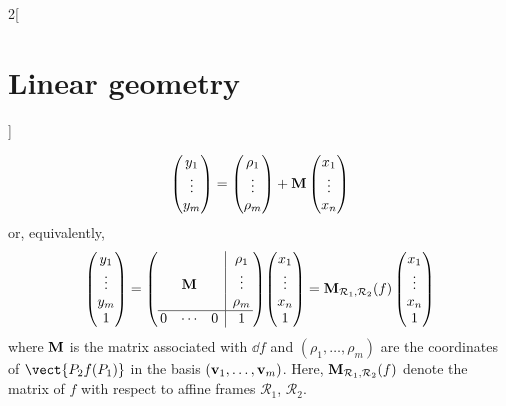 \documentclass[../../../main.tex]{subfiles}
\begin{document}
\begin{multicols}{2}[\section{Linear geometry}]
\begin{proposition}
    $$
      \begin{pmatrix}
        y_1    \\
        \vdots \\
        y_m    \\
      \end{pmatrix}
      =
      \begin{pmatrix}
        \rho_1 \\
        \vdots \\
        \rho_m \\
      \end{pmatrix}
      +\boldsymbol{\mathrm{M}}
      \begin{pmatrix}
        x_1    \\
        \vdots \\
        x_n    \\
      \end{pmatrix}$$
    or, equivalently,
    $$
      \begin{pmatrix}
        y_1    \\
        \vdots \\
        y_m    \\
        1      \\
      \end{pmatrix}
      =\left(
      \begin{array}{@{\,}c cc|c@{\,}}
            &        &   & \rho_1 \\
            & \vf{M} &   & \vdots \\
            &        &   & \rho_m \\
          \hline
          0 & \cdots & 0 & 1
        \end{array}\right)\!
      \begin{pmatrix}
        x_1    \\
        \vdots \\
        x_n    \\
        1      \\
      \end{pmatrix}
      =\vf{M}_{\mathcal{R}_1,\mathcal{R}_2}(f)
      \begin{pmatrix}
        x_1    \\
        \vdots \\
        x_n    \\
        1      \\
      \end{pmatrix}$$
    where $\boldsymbol{\mathrm{M}}$ is the matrix associated with $\dd{f}$ and $(\rho_1,\ldots,\rho_m)$ are the coordinates of $\vect{P_2f(P_1)}$ in the basis $(\boldsymbol{\mathrm{v}}_1,\ldots,\boldsymbol{\mathrm{v}}_m)$. Here, $\boldsymbol{\mathrm{M}}_{\mathcal{R}_1,\mathcal{R}_2}(f)$ denote the matrix of $f$ with respect to affine frames $\mathcal{R}_1$, $\mathcal{R}_2$.
  \end{proposition}

\end{multicols}
\end{document}
